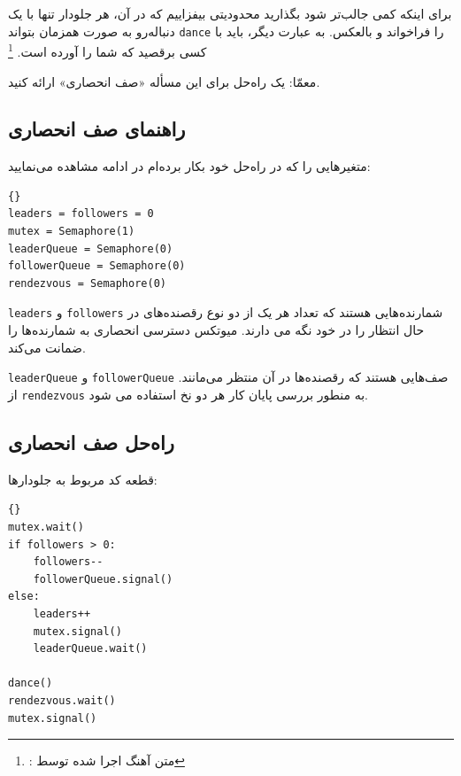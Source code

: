\documentclass{book}
\newcommand{\clearemptydoublepage}{\newpage\cleardoublepage}
\begin{document}
    برای اینکه کمی جالب‌تر شود بگذارید محدودیتی بیفزاییم که در آن، هر جلودار تنها با یک دنباله‌رو به صورت همزمان بتواند \texttt{dance} را 
    فراخواند و بالعکس. به عبارت دیگر، باید با کسی برقصید که شما را آورده است.%
    \footnote{%
    : متن آهنگ اجرا شده توسط }

    معمّا: یک راه‌حل برای این مسأله «صف انحصاری» ارائه کنید.

\clearemptydoublepage
\subsection {راهنمای صف انحصاری}

    متغیرهایی را که در راه‌حل خود بکار برده‌ام در ادامه مشاهده می‌نمایید:

\begin{latin}
\begin{lstlisting}[title={\rl{راهنمای صف}}]{}
leaders = followers = 0
mutex = Semaphore(1)
leaderQueue = Semaphore(0)
followerQueue = Semaphore(0)
rendezvous = Semaphore(0)
\end{lstlisting}
\end{latin}

    \texttt{leaders} و \texttt{followers}
    شمارنده‌هایی هستند که تعداد هر یک از دو نوع رقصنده‌های در حال انتظار را در خود نگه می دارند. 
    میوتکس دسترسی انحصاری به شمارنده‌ها را ضمانت می‌کند.

    \texttt{leaderQueue} و \texttt{followerQueue}
صف‌هایی هستند که رقصنده‌ها در آن  منتظر می‌مانند. 
    از \texttt{rendezvous}
    به منطور بررسی پایان کار هر دو نخ استفاده می شود. 

\clearemptydoublepage
\subsection {راه‌حل صف انحصاری}

    قطعه کد مربوط به جلو‌دارها:

\begin{latin}
\begin{lstlisting}[title=\rl{راه‌حل صف (جلودارها)}]{}
mutex.wait()
if followers > 0:
    followers--
    followerQueue.signal()
else:
    leaders++
    mutex.signal()
    leaderQueue.wait()    

dance()
rendezvous.wait()
mutex.signal()	
\end{lstlisting}
\end{latin}
\end{document}
